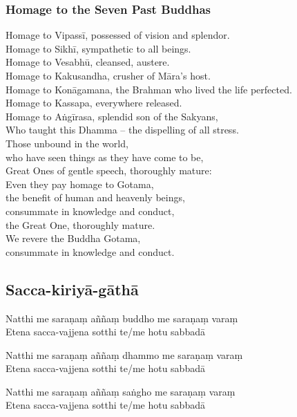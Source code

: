 
\subsubsection{Homage to the Seven Past Buddhas}


Homage to Vipassī, possessed of vision and splendor.\\
Homage to Sikhī, sympathetic to all beings.\\
Homage to Vesabhū, cleansed, austere.\\
Homage to Kakusandha, crusher of Māra's host.\\
Homage to Konāgamana, the Brahman who lived the life perfected.\\
Homage to Kassapa, everywhere released.\\
Homage to Aṅgīrasa, splendid son of the Sakyans,\\
Who taught this Dhamma -- the dispelling of all stress.\\
Those unbound in the world,\\\vin who have seen things as they have come to be,\\
Great Ones of gentle speech, thoroughly mature:\\
Even they pay homage to Gotama,\\\vin the benefit of human and heavenly beings,\\
consummate in knowledge and conduct,\\\vin the Great One, thoroughly mature.\\
We revere the Buddha Gotama,\\\vin consummate in knowledge and conduct.

\subsection{Sacca-kiriyā-gāthā}
\label{natthi-me}


Natthi me saraṇaṃ aññaṃ buddho me saraṇaṃ varaṃ\\
Etena sacca-vajjena sotthi te/me hotu sabbadā

Natthi me saraṇaṃ aññaṃ dhammo me saraṇaṃ varaṃ\\
Etena sacca-vajjena sotthi te/me hotu sabbadā

Natthi me saraṇaṃ aññaṃ saṅgho me saraṇaṃ varaṃ\\
Etena sacca-vajjena sotthi te/me hotu sabbadā

